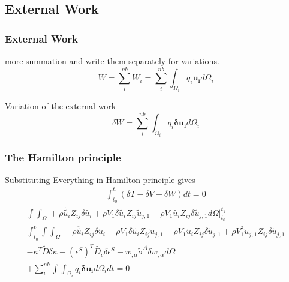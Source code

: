 \documentclass[9pt]{beamer}
\begin{document}
\subsection{External Work}
\begin{frame}
\frametitle{External Work}
more summation and write them separately for variations. 
\begin{equation*}
 W=\sum_i^{nb} W_i=\sum_i^{nb} \int_{\Omega_i} q_i \mathbf{ u_i}  d \Omega_i
\end{equation*}

\begin{block}{Variation of the external work}
\begin{equation*}
\delta W=\sum_i^{nb} \int_{\Omega_i} q_i \mathbf{\delta u_i}  d \Omega_i
\end{equation*}
\end{block}



\end{frame}


\begin{frame}
\frametitle{The Hamilton principle} 
Substituting Everything in Hamilton principle gives
\begin{equation*}
\begin{split}
 \int_{t_0}^{t_1} \left( \delta T - \delta V + \delta W \right) dt    =  0 
\end{split} 
\end{equation*}
\begin{equation*}
\begin{split}
 \int \int_\Omega 
+
\rho \dot{\tilde{u_i}} Z_{ij} \delta \tilde{u_i}
+
\rho V_1 \delta {\tilde{u_i}} Z_{ij} \tilde{u}_{j,1} 
+  
\rho V_1 {\tilde{u_i}} Z_{ij} \delta \tilde{u}_{j,1}  
 d \Omega  \Big|_{t_0}^{t_1} 
 \\ 
 \int_{t_0}^{t_1} \int \int_\Omega 
-
\rho \ddot{\tilde{u_i}} Z_{ij} \delta {\tilde{u_i}}
-
\rho V_1 \delta {\tilde{u_i}} Z_{ij} \dot{\tilde{u}}_{j,1} 
-  
\rho V_1  \tilde{u_i} Z_{ij} \delta \dot{\tilde{u}}_{j,1} 
+
\rho V_1^2 \tilde{u}_{j,1} Z_{ij} \delta \tilde{u}_{j,1}
\\ 
- 
\kappa^T \tilde{D} \delta\kappa 
-
\left(\epsilon^S\right)^T \tilde{D_c} \delta\epsilon^S 
- 
 w_{, \alpha} \tilde{\sigma}^A  \delta w_{, \alpha}  d \Omega     \\
 +   
 \sum_i^{nb}   \int  \int_{\Omega_i} q_i \mathbf{\delta u_i}  d \Omega_i dt = 0
\end{split} 
\end{equation*}
\end{frame}
\end{document}
